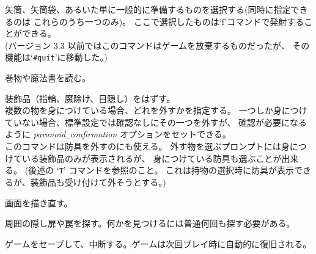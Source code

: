 矢筒、矢筒袋、あるいた単に一般的に準備するものを選択する(同時に指定できるのは
これらのうち一つのみ)。
ここで選択したものは`f'コマンドで発射することができる。\\
(バージョン 3.3 以前ではこのコマンドはゲームを放棄するものだったが、
その機能は`{\tt \#quit}'に移動した。)
\item[\tb{r}]
巻物や魔法書を読む。
\item[\tb{R}]
装飾品（指輪、魔除け、目隠し）をはずす。\\
複数の物を身につけている場合、どれを外すかを指定する。
一つしか身につけていない場合、標準設定では確認なしにその一つを外すが、
確認が必要になるように
{\it paranoid\verb+_+confirmation\/}
オプションをセットできる。\\
このコマンドは防具を外すのにも使える。
外す物を選ぶプロンプトには身につけている装飾品のみが表示されるが、
身につけている防具も選ぶことが出来る。
(後述の `{\tt T}' コマンドを参照のこと。
これは持物の選択時に防具が表示できるが、装飾品も受け付けて外そうとする。)
\item[\tb{\^{}R}]
画面を描き直す。
\item[\tb{s}]
周囲の隠し扉や罠を探す。何かを見つけるには普通何回も探す必要がある。
\item[\tb{S}]
ゲームをセーブして、中断する。ゲームは次回プレイ時に自動的に復旧される。
\item[\tb{t}]

